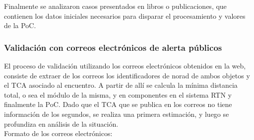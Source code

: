 Finalmente se analizaron casos presentados en libros o publicaciones, que contienen los datos iniciales necesarios para disparar el procesamiento y valores de la PoC.\\


\subsubsection*{Validaci\'on con correos electr\'onicos de alerta p\'ublicos}

El proceso de validaci\'on utilizando los correos electr\'onicos obtenidos en la web, consiste de extraer de los correos los identificadores de norad de ambos objetos y el TCA asociado al encuentro. A partir de all\'i se calcula la m\'inima distancia total, o sea el m\'odulo de la misma, y  en componentes en el sistema RTN y finalmente la PoC.
Dado que el TCA que se publica en los correos no tiene informaci\'on de los segundos, se realiza una primera estimaci\'on, y luego se profundiza en an\'alisis de la situaci\'on.\\

Formato de los correos electr\'onicos:\\
\begin{center}
\end{center}

